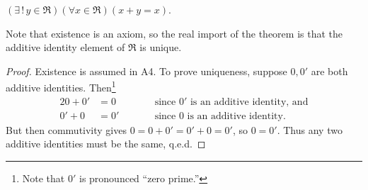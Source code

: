 \begin{theorem} 
$(\exists\, !\, y\in\Re)(\forall x\in\Re)(x+y=x)$.  
\end{theorem}
Note that existence is an axiom, so the real import
of the theorem is that the additive identity element
of $\Re$ is unique.
\newpage

\begin{proof}Existence is assumed in A4.
To prove uniqueness, suppose $0,0'$ are both additive identities.
Then\footnote{%
Note that $0'$ is pronounced ``zero prime.''}
\begin{alignat*}{2}
0+0'&=0&\qquad&\text{since $0'$ is an additive identity, and}\\
0'+0&=0'&&\text{since $0$ is an additive identity.}\end{alignat*}
But then commutivity gives $0=0+0'=0'+0=0'$, so $0=0'$.
Thus any two additive identities must be the same, q.e.d.\end{proof}

